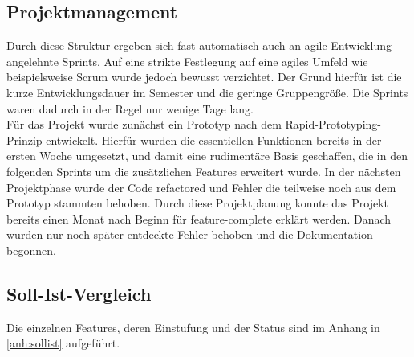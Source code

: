 \subsection*{Projektmanagement}
Durch diese Struktur ergeben sich fast automatisch auch an agile Entwicklung angelehnte Sprints.%
Auf eine strikte Festlegung auf eine agiles Umfeld wie beispielsweise Scrum wurde jedoch bewusst verzichtet.
Der Grund hierfür ist die kurze Entwicklungsdauer im Semester und die geringe Gruppengröße.
Die Sprints waren dadurch in der Regel nur wenige Tage lang. \\%
Für das Projekt wurde zunächst ein Prototyp nach dem Rapid-Prototyping-Prinzip entwickelt.%
Hierfür wurden die essentiellen Funktionen bereits in der ersten Woche umgesetzt, und damit eine rudimentäre Basis geschaffen, die in den folgenden Sprints um die zusätzlichen Features erweitert wurde.%
In der nächsten Projektphase wurde der Code refactored und Fehler die teilweise noch aus dem Prototyp stammten behoben.
Durch diese Projektplanung konnte das Projekt bereits einen Monat nach Beginn für feature-complete erklärt werden.
Danach wurden nur noch später entdeckte Fehler behoben und die Dokumentation begonnen.%
\subsection*{Soll-Ist-Vergleich}
Die einzelnen Features, deren Einstufung und der Status sind im Anhang in \autoref{anh:sollist} aufgeführt.
